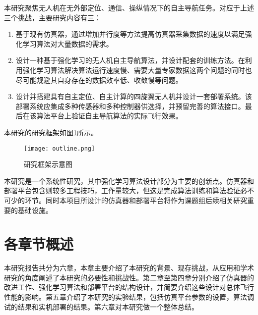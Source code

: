 本研究聚焦无人机在无外部定位、通信、操纵情况下的自主导航任务。对应于上述三个挑战，主要研究内容有三：
\begin{enumerate}
  \item 基于现有仿真器，通过增加并行度等方法提高仿真器采集数据的速度以满足强化学习算法对大量数据的需求。
  \item 设计一种基于强化学习的无人机自主导航算法，并设计配套的训练方法。在利用强化学习算法解决算法运行速度慢、需要大量专家数据这两个问题的同时也尽可能规避其自身存在的数据效率低、收敛慢等问题。
  \item 设计并搭建具有自主定位、自主计算的四旋翼无人机并设计一套部署系统。该部署系统应集成多种传感器和多种控制器供选择，并预留完善的算法接口。最后在该算法平台上验证自主导航算法的实际飞行效果。
\end{enumerate}
本研究的研究框架如图\ref{fig_outline}所示。
\begin{figure}
  \centering
  \texttt{[image: outline.png]}
  \caption{研究框架示意图}
  \label{fig_outline}
\end{figure}

本研究是一个系统性研究，其中强化学习算法设计部分为主要的创新点。仿真器和部署平台包含则较多工程技巧，工作量较大，但这是完成算法训练和算法验证必不可少的环节。同时本项目所设计的仿真器和部署平台将作为课题组后续相关研究重要的基础设施。

\section{各章节概述}
\label{outline}
本研究报告共分为六章，本章主要介绍了本研究的背景、现存挑战，从应用和学术研究的角度阐述了本研究的必要性和挑战性。第二章至第四章分别介绍了仿真器的改进工作、强化学习算法和部署平台的结构设计，并简要介绍这些设计对总体飞行性能的影响。第五章介绍了本研究的实验结果，包括仿真平台参数的设置，算法调试的结果和实机部署的结果。第六章对本研究做一个整体总结。






